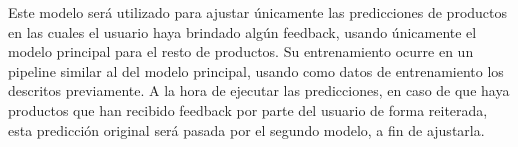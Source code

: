 Este modelo será utilizado para ajustar únicamente las predicciones de productos en las cuales el usuario haya brindado algún feedback, usando únicamente el modelo principal para el resto de productos. Su entrenamiento ocurre en un pipeline similar al del modelo principal, usando como datos de entrenamiento los descritos previamente. A la hora de ejecutar las predicciones, en caso de que haya productos que han recibido feedback por parte del usuario de forma reiterada, esta predicción original será pasada por el segundo modelo, a fin de ajustarla.
